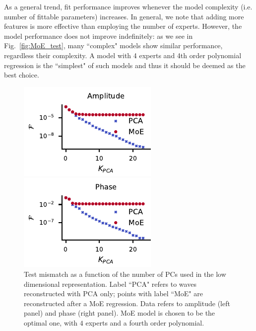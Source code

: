 \documentclass[twocolumn,showpacs,preprintnumbers,nofootinbib,prd,
superscriptaddress,10pt]{revtex4-1}
\begin{document}
As a general trend, fit performance improves whenever the model complexity (i.e. number of fittable parameters) increases.
In general, we note that adding more features is more effective than employing the number of experts.
However, the model performance does not improve indefinitely: as we see in Fig.~\ref{fig:MoE_test}, many ``complex" models show similar performance, regardless their complexity.
A model with 4 experts and 4th order polynomial regression is the ``simplest" of such models and thus it should be deemed as the best choice.
\begin{figure}[!t]
	\centering 
    \begin{minipage}{.5\linewidth}
		\centering
	    \includegraphics[width=\linewidth]{img/mismatch_MoE_vs_PCA_amp.pdf}
	\end{minipage}\hfill
    \begin{minipage}{.5\linewidth}
		\centering
	    \includegraphics[width=\linewidth]{img/mismatch_MoE_vs_PCA_ph.pdf}
	\end{minipage}
	\caption{Test mismatch as a function of the number of PCs used in the low dimensional representation.
Label ``PCA" refers to waves reconstructed with PCA only; points with label ``MoE" are reconstructed after a MoE regression.
Data refers to amplitude (left panel) and phase (right panel).
MoE model is chosen to be the optimal one, with $4$ experts and a fourth order polynomial.
}
	\label{fig:mismatch_MoE_vs_PCA}
\end{figure}
\end{document}
